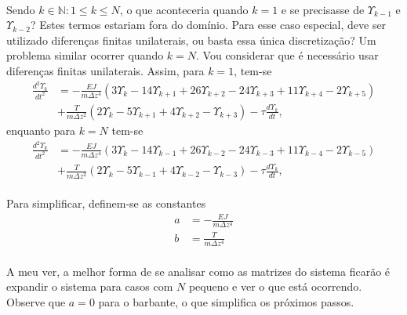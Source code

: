 \documentclass[a4paper,11pt]{scrartcl} %
\numberwithin{equation}{section} %
\numberwithin{figure}{section} %
\numberwithin{table}{section} %
\begin{document}
\paragraph{} Sendo $k\in \mathbb{N}:1\le k \le N$, o que aconteceria quando $k=1$ e se precisasse de $\Upsilon_{k-1}$ e $\Upsilon_{k-2}$? Estes termos estariam fora do domínio. Para esse caso especial, deve ser utilizado diferenças finitas unilaterais, ou basta essa única discretização? Um problema similar ocorrer quando $k=N$. Vou considerar que é necessário usar diferenças finitas unilaterais. Assim, para $k=1$, tem-se \begin{align}
	\frac{d^2\Upsilon_k}{dt^2} &= -\frac{EJ}{m\Delta z^4}\left(3\Upsilon_{k} - 14\Upsilon_{k+1}+26\Upsilon_{k+2}-24\Upsilon_{k+3}+11\Upsilon_{k+4} - 2\Upsilon_{k+5}\right)\nonumber\\
	&+ \frac{T}{m\Delta z^2}\left(2\Upsilon_{k}-5\Upsilon_{k+1} + 4\Upsilon_{k+2} -\Upsilon_{k+3}\right)-\tau\frac{d\Upsilon_k}{dt},
\end{align} enquanto para $k=N$ tem-se \begin{align}
	\frac{d^2\Upsilon_k}{dt^2} &= -\frac{EJ}{m\Delta z^4}\left(3\Upsilon_{k} - 14\Upsilon_{k-1}+26\Upsilon_{k-2}-24\Upsilon_{k-3}+11\Upsilon_{k-4} - 2\Upsilon_{k-5}\right)\nonumber\\
	&+ \frac{T}{m\Delta z^2}\left(2\Upsilon_{k}-5\Upsilon_{k-1} + 4\Upsilon_{k-2} -\Upsilon_{k-3}\right)-\tau\frac{d\Upsilon_k}{dt},
\end{align}

\paragraph{} Para simplificar, definem-se as constantes \begin{align}
	a &= -\frac{EJ}{m\Delta z^4}\\
	b &= \frac{T}{m\Delta z^4}
\end{align}

\paragraph{} A meu ver, a melhor forma de se analisar como as matrizes do sistema ficarão é expandir o sistema para casos com $N$ pequeno e ver o que está ocorrendo. Observe que $a=0$ para o barbante, o que simplifica os próximos passos.
\end{document}
